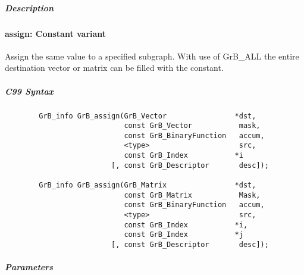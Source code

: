 \subparagraph{Description}

\paragraph{{\sf assign}: Constant variant}

Assign the same value to a specified subgraph.  With use of {\sf GrB\_ALL} the entire
destination vector or matrix can be filled with the constant.


\subparagraph{C99 Syntax}

\begin{verbatim}
        GrB_info GrB_assign(GrB_Vector                *dst,
                            const GrB_Vector           mask,
                            const GrB_BinaryFunction   accum,
                            <type>                     src,
                            const GrB_Index           *i
                         [, const GrB_Descriptor       desc]);

        GrB_info GrB_assign(GrB_Matrix                *dst,
                            const GrB_Matrix           Mask,
                            const GrB_BinaryFunction   accum,
                            <type>                     src,
                            const GrB_Index           *i,
                            const GrB_Index           *j
                         [, const GrB_Descriptor       desc]);
\end{verbatim}

\subparagraph{Parameters}

